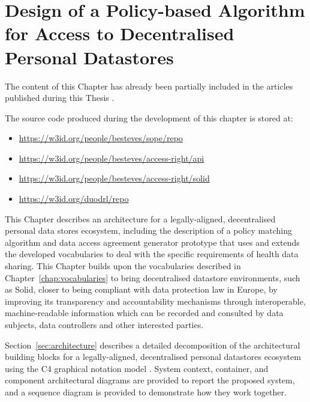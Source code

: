 \chapter{Design of a Policy-based Algorithm for Access to Decentralised Personal Datastores}
\label{chap:matching}

\begin{tcolorbox}[colback=royallavender!40]
The content of this Chapter has already been partially included in the articles published during this Thesis \citep{esteves_odrl_2021,esteves_using_2022,pandit_enhancing_2024,esteves_automating_2022}.
\end{tcolorbox}

\begin{tcolorbox}[colback=royallavender!10]
The source code produced during the development of this chapter is stored at:
\begin{itemize}
    \item \url{https://w3id.org/people/besteves/sope/repo}
    \item \url{https://w3id.org/people/besteves/access-right/api}
    \item \url{https://w3id.org/people/besteves/access-right/solid}
    \item \url{https://w3id.org/duodrl/repo}
\end{itemize}
\end{tcolorbox}

This Chapter describes an architecture for a legally-aligned, decentralised personal data stores ecosystem, including the description of a policy matching algorithm and data access agreement generator prototype that uses and extends the developed vocabularies to deal with the specific requirements of health data sharing.
This Chapter builds upon the vocabularies described in Chapter~\ref{chap:vocabularies} to bring decentralised datastore environments, such as Solid, closer to being compliant with data protection law in Europe, by improving its transparency and accountability mechanisms through interoperable, machine-readable information which can be recorded and consulted by data subjects, data controllers and other interested parties.

Section~\ref{sec:architecture} describes a detailed decomposition of the architectural building blocks for a legally-aligned, decentralised personal datastores ecosystem using the C4 graphical notation model \citep{brown_c4_2015}.
System context, container, and component architectural diagrams are provided to report the proposed system, and a sequence diagram is provided to demonstrate how they work together.

